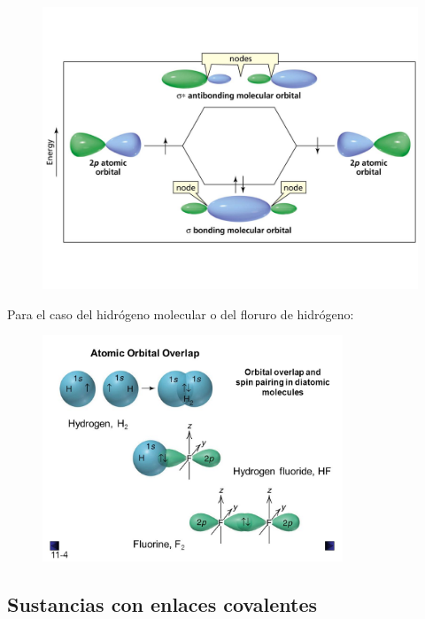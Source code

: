 \documentclass{article}
\begin{document}
\begin{figure}[h]
    \centering
    \includegraphics[width=1\textwidth]{sigma.JPG}
    
    \label{Figura 1}
\end{figure}

Para el caso del hidrógeno molecular o del floruro de hidrógeno:

\begin{figure}[h]
    \centering
    \includegraphics[width=0.8\textwidth]{hidrogeno_fluor.jpg}
    
    \label{Figura 1}
\end{figure}

\subsection{Sustancias con enlaces covalentes}
\end{document}
